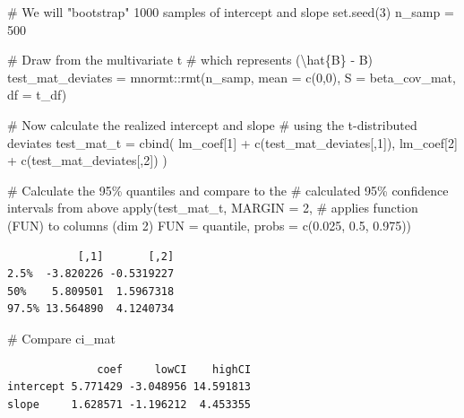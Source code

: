 \documentclass[
  letterpaper,
  DIV=11,
  numbers=noendperiod]{scrreprt}
\newenvironment{Shaded}{\begin{snugshade}}{\end{snugshade}}
\newcommand{\AttributeTok}[1]{\textcolor[rgb]{0.40,0.45,0.13}{#1}}
\newcommand{\CommentTok}[1]{\textcolor[rgb]{0.37,0.37,0.37}{#1}}
\newcommand{\DecValTok}[1]{\textcolor[rgb]{0.68,0.00,0.00}{#1}}
\newcommand{\FloatTok}[1]{\textcolor[rgb]{0.68,0.00,0.00}{#1}}
\newcommand{\FunctionTok}[1]{\textcolor[rgb]{0.28,0.35,0.67}{#1}}
\newcommand{\NormalTok}[1]{\textcolor[rgb]{0.00,0.23,0.31}{#1}}
\newcommand{\OtherTok}[1]{\textcolor[rgb]{0.00,0.23,0.31}{#1}}
\newcommand{\SpecialCharTok}[1]{\textcolor[rgb]{0.37,0.37,0.37}{#1}}
\begin{document}
\begin{Shaded}
\begin{Highlighting}[]
\CommentTok{\# We will "bootstrap" 1000 samples of intercept and slope}
\FunctionTok{set.seed}\NormalTok{(}\DecValTok{3}\NormalTok{)}
\NormalTok{n\_samp }\OtherTok{=} \DecValTok{500}

\CommentTok{\# Draw from the multivariate t }
\CommentTok{\# which represents (\textbackslash{}hat\{B\} {-} B)}
\NormalTok{test\_mat\_deviates }\OtherTok{=} 
\NormalTok{  mnormt}\SpecialCharTok{::}\FunctionTok{rmt}\NormalTok{(n\_samp, }\AttributeTok{mean =} \FunctionTok{c}\NormalTok{(}\DecValTok{0}\NormalTok{,}\DecValTok{0}\NormalTok{), }\AttributeTok{S =}\NormalTok{ beta\_cov\_mat, }\AttributeTok{df =}\NormalTok{ t\_df)}

\CommentTok{\# Now calculate the realized intercept and slope}
\CommentTok{\# using the t{-}distributed deviates}
\NormalTok{test\_mat\_t }\OtherTok{=} \FunctionTok{cbind}\NormalTok{(}
\NormalTok{  lm\_coef[}\DecValTok{1}\NormalTok{] }\SpecialCharTok{+} \FunctionTok{c}\NormalTok{(test\_mat\_deviates[,}\DecValTok{1}\NormalTok{]),}
\NormalTok{  lm\_coef[}\DecValTok{2}\NormalTok{] }\SpecialCharTok{+} \FunctionTok{c}\NormalTok{(test\_mat\_deviates[,}\DecValTok{2}\NormalTok{])}
\NormalTok{)}

\CommentTok{\# Calculate the 95\% quantiles and compare to the }
\CommentTok{\# calculated 95\% confidence intervals from above}
\FunctionTok{apply}\NormalTok{(test\_mat\_t, }
      \AttributeTok{MARGIN =} \DecValTok{2}\NormalTok{, }\CommentTok{\# applies function (FUN) to columns (dim 2)}
      \AttributeTok{FUN =}\NormalTok{ quantile, }\AttributeTok{probs =} \FunctionTok{c}\NormalTok{(}\FloatTok{0.025}\NormalTok{, }\FloatTok{0.5}\NormalTok{, }\FloatTok{0.975}\NormalTok{))}
\end{Highlighting}
\end{Shaded}

\begin{verbatim}
           [,1]       [,2]
2.5%  -3.820226 -0.5319227
50%    5.809501  1.5967318
97.5% 13.564890  4.1240734
\end{verbatim}

\begin{Shaded}
\begin{Highlighting}[]
\CommentTok{\# Compare}
\NormalTok{ci\_mat}
\end{Highlighting}
\end{Shaded}

\begin{verbatim}
              coef     lowCI    highCI
intercept 5.771429 -3.048956 14.591813
slope     1.628571 -1.196212  4.453355
\end{verbatim}
\end{document}
